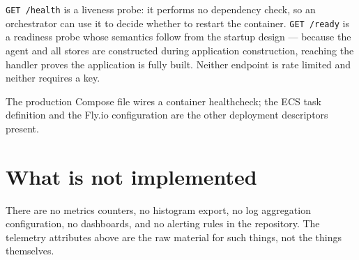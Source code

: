 \texttt{GET /health} is a liveness probe: it performs no dependency check, so
an orchestrator can use it to decide whether to restart the container.
\texttt{GET /ready} is a readiness probe whose semantics follow from the
startup design --- because the agent and all stores are constructed during
application construction, reaching the handler proves the application is fully
built. Neither endpoint is rate limited and neither requires a key.

The production Compose file wires a container healthcheck; the ECS task
definition and the Fly.io configuration are the other deployment descriptors
present.

\section{What is not implemented}

There are no metrics counters, no histogram export, no log aggregation
configuration, no dashboards, and no alerting rules in the repository. The
telemetry attributes above are the raw material for such things, not the things
themselves.
